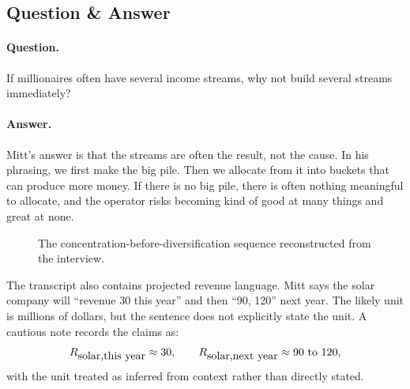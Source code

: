 \subsection{Question \& Answer}

\paragraph{Question.}
If millionaires often have several income streams, why not build several streams immediately?

\paragraph{Answer.}
Mitt's answer is that the streams are often the result, not the cause. In his phrasing, we first make the big pile. Then we allocate from it into buckets that can produce more money. If there is no big pile, there is often nothing meaningful to allocate, and the operator risks becoming kind of good at many things and great at none.

\begin{figure}
\centering
{}
\caption{The concentration-before-diversification sequence reconstructed from the interview.}
\end{figure}

The transcript also contains projected revenue language. Mitt says the solar company will ``revenue 30 this year'' and then ``90, 120'' next year. The likely unit is millions of dollars, but the sentence does not explicitly state the unit. A cautious note records the claims as:
\begin{equation}
  R_{\hbox{solar,this year}}\approx 30,
  \qquad
  R_{\hbox{solar,next year}}\approx 90\hbox{ to }120,
\end{equation}
with the unit treated as inferred from context rather than directly stated.

